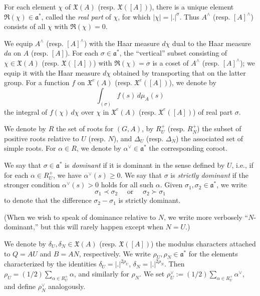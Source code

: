 \documentclass[reqno]{amsart}
\theoremstyle{plain} \newtheorem{theorem} {Theorem}
\theoremstyle{definition} \newtheorem{definition} [theorem] {Definition}
\theoremstyle{itplain} %
\numberwithin{equation}{section}
\numberwithin{theorem}{section}
\renewcommand{\geq}{\geqslant}
\begin{document}
For each element $\chi$ of $\mathfrak{X}(A)$ (resp. $\mathfrak{X}([A])$), there is a unique element $\Re(\chi) \in \mathfrak{a}^*$, called the \emph{real part} of $\chi$, for which $|\chi| = |.|^{\sigma}$.  Thus $A^\wedge$ (resp. $[A]^\wedge$) consists of all $\chi$ with $\Re(\chi) = 0$.

We equip $A^\wedge$ (resp. $[A]^\wedge$) with the Haar measure $d \chi$ dual to the Haar measure $d a$ on $A$ (resp. $[A]$).  For each $\sigma \in \mathfrak{a}^*$, the ``vertical'' subset consisting of $\chi \in \mathfrak{X}(A)$ (resp. $\mathfrak{X}([A])$) with $\Re(\chi) = \sigma$ is a coset of $A^\wedge$ (resp. $[A]^\wedge$); we equip it with the Haar measure $d \chi$ obtained by transporting that on the latter group.  For a function $f$ on $\mathfrak{X}^e(A)$ (resp. $\mathfrak{X}^e([A])$), we denote by 
\begin{equation}\label{eq:int-_sigma-fs}
  \int _{(\sigma)} f(s) \, d \mu_A(s)
\end{equation}
the integral of $f(\chi) \, d \chi$ over $\chi$ in $\mathfrak{X}^e(A)$ (resp. $\mathfrak{X}^e([A])$) of real part $\sigma$.

We denote by $R$ the set of roots for $(G,A)$, by $R_U^+$ (resp. $R_N^+$) the subset of positive roots relative to $U$ (resp. $N$), and $\Delta_U$ (resp. $\Delta_N$) the associated set of simple roots.   For $\alpha \in R$, we denote by $\alpha^\vee \in \mathfrak{a}^*$ the corresponding coroot.

We say that $\sigma \in \mathfrak{a}^*$ is \emph{dominant} if it is dominant in the sense defined by $U$, i.e., if for each $\alpha \in R_U^+$, we have $\alpha^\vee(s) \geq 0$.  We say that $\sigma$ is \emph{strictly dominant} if the stronger condition $\alpha^\vee(s) > 0$ holds for all such $\alpha$.  Given $\sigma_1, \sigma_2 \in \mathfrak{a}^*$, we write
\begin{equation*}
  \sigma_1 \prec \sigma_2 \quad \text{ or } \quad \sigma_2 \succ \sigma_1
\end{equation*}
to denote that the difference $\sigma_2 - \sigma_1$ is strictly dominant. 

(When we wish to speak of dominance relative to $N$, we write more verbosely ``$N$-dominant,'' but this will rarely happen except when $N = U$.)

We denote by $\delta_U, \delta_N \in \mathfrak{X}(A)$ (resp. $\mathfrak{X}([A])$) the modulus characters attached to $Q = A U$ and $B = A N$, respectively.  We write $\rho_U, \rho_N \in \mathfrak{a}^*$ for the elements characterized by the identities $\delta_U = |.|^{2 \rho_U}$, $\delta_N = |.|^{2 \rho_N}$.  Then $\rho_U = (1/2) \sum_{\alpha \in R_U^+} \alpha$, and similarly for $\rho_N$.     We set $\rho_U^\vee := (1/2) \sum_{\alpha \in R_U^+} \alpha^\vee$, and define $\rho_N^\vee$ analogously.
\end{document}
